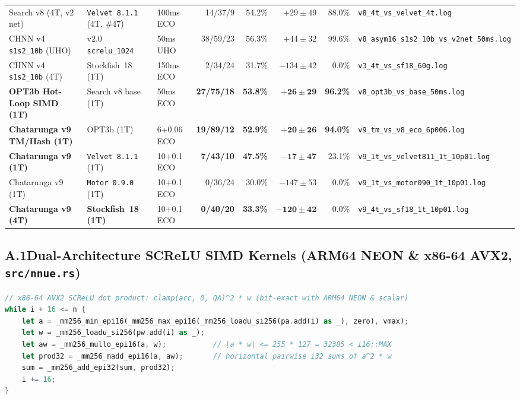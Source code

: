 \documentclass[10.5pt,letterpaper]{article}
\begin{document}
\begin{table}[H]
{\begin{tabular}{@{}lllrrrrl@{}}
Search v8 (4T, v2 net) & \texttt{Velvet 8.1.1} (4T, \#47) & 100ms ECO & 14/37/9 & 54.2\% & $+29 \pm 49$ & 88.0\% & \texttt{v8\_4t\_vs\_velvet\_4t.log} \\
CHNN v4 \texttt{s1s2\_10b} (UHO) & v2.0 \texttt{screlu\_1024} & 50ms UHO & 38/59/23 & 56.3\% & $+44 \pm 32$ & 99.6\% & \texttt{v8\_asym16\_s1s2\_10b\_vs\_v2net\_50ms.log} \\
CHNN v4 \texttt{s1s2\_10b} (4T) & Stockfish~18 (1T) & 150ms ECO & 2/34/24 & 31.7\% & $-134 \pm 42$ & 0.0\% & \texttt{v3\_4t\_vs\_sf18\_60g.log} \\
\midrule
\textbf{OPT3b Hot-Loop SIMD (1T)} & Search v8 base (1T) & 50ms ECO & \textbf{27/75/18} & \textbf{53.8\%} & $\mathbf{+26 \pm 29}$ & \textbf{96.2\%} & \texttt{v8\_opt3b\_vs\_base\_50ms.log} \\
\textbf{Chatarunga v9 TM/Hash (1T)} & OPT3b (1T) & 6+0.06 ECO & \textbf{19/89/12} & \textbf{52.9\%} & $\mathbf{+20 \pm 26}$ & \textbf{94.0\%} & \texttt{v9\_tm\_vs\_v8\_eco\_6p006.log} \\
\textbf{Chatarunga v9 (1T)} & \texttt{Velvet 8.1.1} (1T) & 10+0.1 ECO & \textbf{7/43/10} & \textbf{47.5\%} & $\mathbf{-17 \pm 47}$ & 23.1\% & \texttt{v9\_1t\_vs\_velvet811\_1t\_10p01.log} \\
Chatarunga v9 (1T) & \texttt{Motor 0.9.0} (1T) & 10+0.1 ECO & 0/36/24 & 30.0\% & $-147 \pm 53$ & 0.0\% & \texttt{v9\_1t\_vs\_motor090\_1t\_10p01.log} \\
\textbf{Chatarunga v9 (4T)} & \textbf{Stockfish~18 (1T)} & 10+0.1 ECO & \textbf{0/40/20} & \textbf{33.3\%} & $\mathbf{-120 \pm 42}$ & 0.0\% & \texttt{v9\_4t\_vs\_sf18\_1t\_10p01.log} \\
\bottomrule
\end{tabular}%
}
\end{table}

\clearpage
\subsection*{A.1\quad Dual-Architecture SCReLU SIMD Kernels (ARM64 NEON \& x86-64 AVX2, \texttt{src/nnue.rs})}
\begin{lstlisting}[language=Rust]
// x86-64 AVX2 SCReLU dot product: clamp(acc, 0, QA)^2 * w (bit-exact with ARM64 NEON & scalar)
while i + 16 <= n {
    let a = _mm256_min_epi16(_mm256_max_epi16(_mm256_loadu_si256(pa.add(i) as _), zero), vmax);
    let w = _mm256_loadu_si256(pw.add(i) as _);
    let aw = _mm256_mullo_epi16(a, w);           // |a * w| <= 255 * 127 = 32385 < i16::MAX
    let prod32 = _mm256_madd_epi16(a, aw);       // horizontal pairwise i32 sums of a^2 * w
    sum = _mm256_add_epi32(sum, prod32);
    i += 16;
}
\end{lstlisting}
\end{document}
